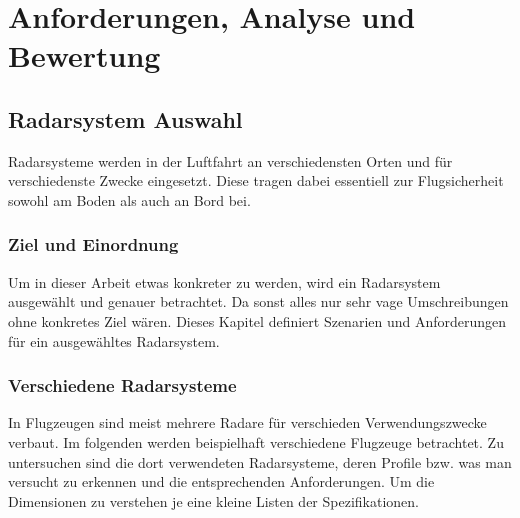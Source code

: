 \part{Anforderungen, Analyse und Bewertung}
\chapter{Radarsystem Auswahl}\label{chap:szenarien}
Radarsysteme werden in der Luftfahrt an verschiedensten Orten und für verschiedenste Zwecke eingesetzt. 
Diese tragen dabei essentiell zur Flugsicherheit sowohl am Boden als auch an Bord bei.

\section{Ziel und Einordnung}\label{sec:szenarien-intro}
Um in dieser Arbeit etwas konkreter zu werden, wird ein Radarsystem ausgewählt und genauer betrachtet.
Da sonst alles nur sehr vage Umschreibungen ohne konkretes Ziel wären. 
Dieses Kapitel definiert Szenarien und Anforderungen für ein ausgewähltes Radarsystem.

\section{Verschiedene Radarsysteme}
In Flugzeugen sind meist mehrere Radare für verschieden Verwendungszwecke verbaut. Im folgenden werden 
beispielhaft verschiedene Flugzeuge betrachtet. Zu untersuchen sind die dort verwendeten Radarsysteme, 
deren Profile bzw. was man versucht zu erkennen und die entsprechenden Anforderungen. Um die Dimensionen 
zu verstehen je eine kleine Listen der Spezifikationen.



